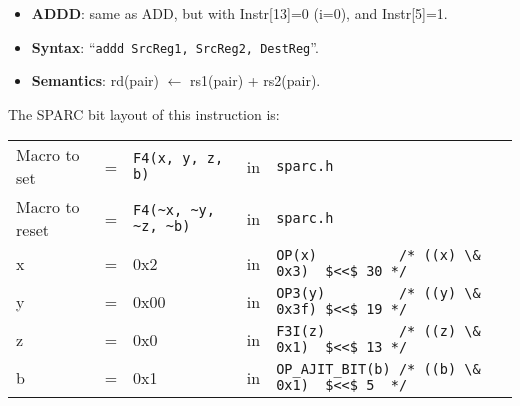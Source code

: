 \begin{enumerate}
  \begin{itemize}
  \item []\textbf{ADDD}: same as ADD, but with Instr[13]=0 (i=0), and
    Instr[5]=1.
  \item []\textbf{Syntax}: ``\texttt{addd  SrcReg1, SrcReg2, DestReg}''.
  \item []\textbf{Semantics}: rd(pair) $\leftarrow$ rs1(pair) + rs2(pair).
  \end{itemize}

  The SPARC bit layout of this instruction is:

  \begin{tabular}[h]{lclcl}
    Macro to set   &=&  \verb|F4(x, y, z, b)|     &in& \verb|sparc.h|     \\
    Macro to reset &=&  \verb|F4(~x, ~y, ~z, ~b)| &in& \verb|sparc.h|     \\
    x &=& 0x2      &in& \verb|OP(x)          /* ((x) \& 0x3)  $<<$ 30 */| \\
    y &=& 0x00     &in& \verb|OP3(y)         /* ((y) \& 0x3f) $<<$ 19 */| \\
    z &=& 0x0      &in& \verb|F3I(z)         /* ((z) \& 0x1)  $<<$ 13 */| \\
    b &=& 0x1      &in& \verb|OP_AJIT_BIT(b) /* ((b) \& 0x1)  $<<$ 5  */|
  \end{tabular}


\end{enumerate}
